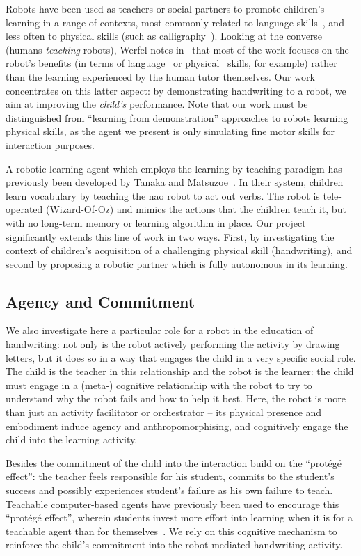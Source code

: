 \documentclass{article}
\begin{document}
Robots have been used as teachers or social partners to promote children's
learning in a range of contexts, most commonly related to language
skills~\cite{han2010robot}, and less often to physical skills (such as
calligraphy~\cite{Matsui2013}). Looking at the converse (humans \emph{teaching}
robots), Werfel notes in~\cite{Werfel2014} that most of the work focuses on the
robot's benefits (in terms of language~\cite{Saunders2010} or
physical~\cite{Mulling2013} skills, for example) rather than the learning
experienced by the human tutor themselves.  Our work concentrates on this latter
aspect: by demonstrating handwriting to a robot, we aim at improving the
\emph{child's} performance. Note that our work must be distinguished from
``learning from demonstration'' approaches to robots learning physical skills,
as the agent we present is only simulating fine motor skills for interaction
purposes.

A robotic learning agent which employs the learning by teaching paradigm has
previously been developed by Tanaka and Matsuzoe~\cite{Tanaka2012}. In their
system, children learn vocabulary by teaching the {\sc nao} robot to act out
verbs. The robot is tele-operated (Wizard-Of-Oz) and mimics the actions that the
children teach it, but with no long-term memory or learning algorithm in place.
Our project significantly extends this line of work in two ways. First, by
investigating the context of children's acquisition of a challenging physical
skill (handwriting), and second by proposing a robotic partner which is fully
autonomous in its learning.

\subsection{Agency and Commitment}

We also investigate here a particular role for a robot in the
education of handwriting: not only is the robot actively performing the activity
by drawing letters, but it does so in a way that engages the child in a very
specific social role. The child is the teacher in this relationship and the
robot is the learner: the child must engage in a (meta-) cognitive relationship
with the robot to try to understand why the robot fails and how to help it best.
Here, the robot is more than just an activity facilitator or orchestrator -- its
physical presence and embodiment induce agency and anthropomorphising, and
cognitively engage the child into the learning activity.

Besides the commitment of the child into the interaction build on the
``prot\'eg\'e effect'': the teacher feels responsible for his student, commits
to the student's success and possibly experiences student's failure as his own
failure to teach. Teachable computer-based agents have previously been used to
encourage this ``prot\'eg\'e effect'', wherein students invest more effort into
learning when it is for a teachable agent than for themselves~\cite{Chase2009}.
We rely on this cognitive mechanism to reinforce the child's commitment into the
robot-mediated handwriting activity.
\end{document}
